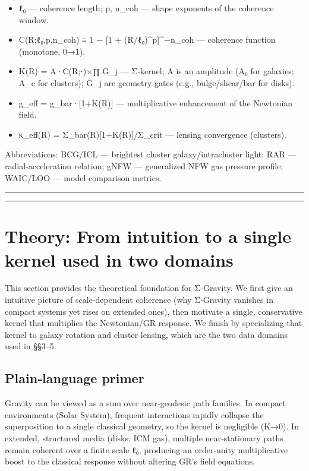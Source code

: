 \documentclass[11pt,a4paper]{article}
\begin{document}
\begin{itemize}
\item ℓ₀ — coherence length; p, n\_coh — shape exponents of the coherence window.
\item C(R;ℓ₀,p,n\_coh) ≡ 1 − [1 + (R/ℓ₀)^p]^{−n\_coh} — coherence function (monotone, 0→1).
\item K(R) = A·C(R;⋅)×∏ G\_j — Σ‑kernel; A is an amplitude (A₀ for galaxies; A\_c for clusters); G\_j are geometry gates (e.g., bulge/shear/bar for disks).
\item g\_eff = g\_bar·[1+K(R)] — multiplicative enhancement of the Newtonian field.
\item κ\_eff(R) = Σ\_bar(R)[1+K(R)]/Σ\_crit — lensing convergence (clusters).
\end{itemize}


Abbreviations: BCG/ICL — brightest cluster galaxy/intracluster light; RAR — radial‑acceleration relation; gNFW — generalized NFW gas pressure profile; WAIC/LOO — model comparison metrics.


\medskip\hrule\medskip

\medskip\hrule\medskip


\section{Theory: From intuition to a single kernel used in two domains}


This section provides the theoretical foundation for Σ‑Gravity. We first give an intuitive picture of scale‑dependent coherence (why Σ‑Gravity vanishes in compact systems yet rises on extended ones), then motivate a single, conservative kernel that multiplies the Newtonian/GR response. We finish by specializing that kernel to galaxy rotation and cluster lensing, which are the two data domains used in §§3–5.


\subsection{Plain‑language primer}


Gravity can be viewed as a sum over near‑geodesic path families. In compact environments (Solar System), frequent interactions rapidly collapse the superposition to a single classical geometry, so the kernel is negligible (K→0). In extended, structured media (disks; ICM gas), multiple near‑stationary paths remain coherent over a finite scale ℓ₀, producing an order‑unity multiplicative boost to the classical response without altering GR’s field equations.
\end{document}
